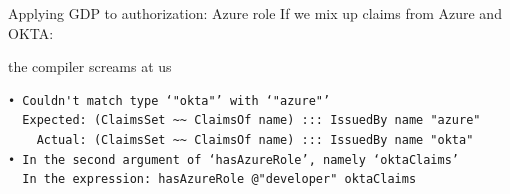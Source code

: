 \documentclass[
  9pt,
  ignorenonframetext,
]{beamer}
\newenvironment{Shaded}{}{}
\newcommand{\DataTypeTok}[1]{\textcolor[rgb]{0.56,0.13,0.00}{#1}}
\newcommand{\KeywordTok}[1]{\textcolor[rgb]{0.00,0.44,0.13}{\textbf{#1}}}
\newcommand{\NormalTok}[1]{#1}
\newcommand{\OperatorTok}[1]{\textcolor[rgb]{0.40,0.40,0.40}{#1}}
\newcommand{\OtherTok}[1]{\textcolor[rgb]{0.00,0.44,0.13}{#1}}
\newcommand{\StringTok}[1]{\textcolor[rgb]{0.25,0.44,0.63}{#1}}
\begin{document}
\begin{frame}[fragile]{Applying GDP to authorization: Azure role}
\protect\hypertarget{applying-gdp-to-authorization-azure-role-1}{}
If we mix up claims from Azure and OKTA:

\begin{Shaded}
\end{Shaded}

the compiler screams at us

\begin{verbatim}
• Couldn't match type ‘"okta"’ with ‘"azure"’
  Expected: (ClaimsSet ~~ ClaimsOf name) ::: IssuedBy name "azure"
    Actual: (ClaimsSet ~~ ClaimsOf name) ::: IssuedBy name "okta"
• In the second argument of ‘hasAzureRole’, namely ‘oktaClaims’
  In the expression: hasAzureRole @"developer" oktaClaims
\end{verbatim}



\end{frame}
\end{document}
